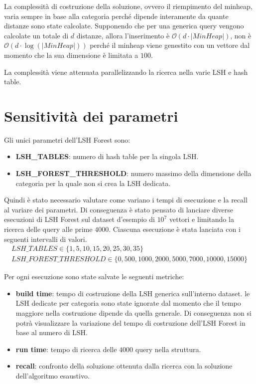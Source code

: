 La complessità di costruzione della soluzione, ovvero il riempimento del minheap,
varia sempre in base alla categoria perché dipende interamente da quante distanze 
sono state calcolate. Supponendo che per una generica query vengono calcolate un 
totale di $d$ distanze, allora l'inserimento è $\mathcal{O}(d\cdot |MinHeap|)$, non è 
$\mathcal{O}(d\cdot \log(|MinHeap|))$ perché il minheap viene genestito con un vettore dal 
momento che la sua dimensione è limitata a $100$.

La complessità viene attenuata parallelizzando la ricerca nella varie LSH e hash table.

\section{Sensitività dei parametri}
Gli unici parametri dell'LSH Forest sono:
\begin{itemize}
    \item \textbf{LSH\_TABLES}: numero di hash table per la singola LSH.
    \item \textbf{LSH\_FOREST\_THRESHOLD}: numero massimo della dimensione della categoria per la
    quale non si crea la LSH dedicata.
\end{itemize} 

Quindi è stato necessario valutare come variano i tempi di esecuzione e la recall
al variare dei parametri. Di conseguenza è stato pensato di lanciare diverse 
esecuzioni di LSH Forest sul dataset d'esempio di $10^7$ vettori e limitando la ricerca delle query alle 
prime $4000$. Ciascuna esecuzione è stata lanciata con i seguenti intervalli di valori.
\begin{equation}
    \begin{array}{c}
        LSH\_TABLES \in \{1, 5, 10, 15, 20, 25, 30, 35\}\\
        LSH\_FOREST\_THRESHOLD \in \{0, 500, 1000, 2000, 5000, 7000, 10000, 15000\}
    \end{array}
\end{equation}

Per ogni esecuzione sono state salvate le seguenti metriche:
\begin{itemize}
    \item \textbf{build time}: tempo di costruzione della LSH generica sull'interno 
    dataset. le LSH dedicate per categoria sono state ignorate dal momento che il tempo maggiore nella costruzione 
    dipende da quella generale. Di conseguenza non si potrà visualizzare la variazione 
    del tempo di costruzione dell'LSH Forest in base al numero di LSH.
    \item \textbf{run time}: tempo di ricerca delle $4000$ query nella struttura.
    \item \textbf{recall}: confronto della soluzione ottenuta dalla ricerca con 
    la soluzione dell'algoritmo esaustivo.
\end{itemize}

